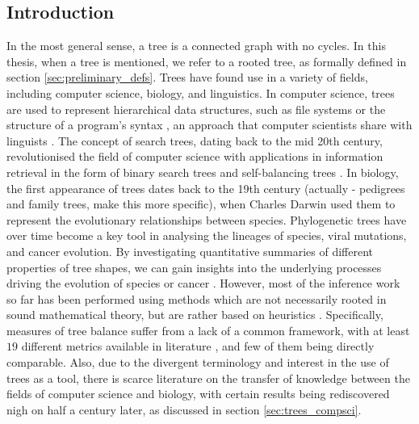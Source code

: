 \subsection{Introduction}
In the most general sense, a tree is a connected graph with no cycles. In this thesis, when a tree is
mentioned, we refer to a rooted tree, as formally defined in section \ref{sec:preliminary_defs}.
Trees have found use in a variety of fields, including computer science, biology, and linguistics.
In computer science, trees are used to represent hierarchical data structures, such as file systems \cite{nievergelt_binary_1974}
or the structure of a program's syntax \cite{knuth_semantics_1968}, an approach that computer scientists
share with linguists \cite{chomsky_syntactic_1957}. The concept of search trees, dating back to the mid 20th century,
revolutionised the field of computer science with applications in information retrieval in the form of
binary search trees and self-balancing trees \cite{nievergelt_binary_1972, knuth_art_1997}. In biology,
the first appearance of trees dates back to the 19th century (actually - pedigrees and family trees, make this more specific), when Charles Darwin used them to represent the evolutionary
relationships between species. Phylogenetic trees have over time become a key tool in analysing the
lineages of species, viral mutations, and cancer evolution. By investigating quantitative summaries of different properties
of tree shapes, we can gain insights into the underlying processes driving the evolution of species \cite{mooers_inferring_1997}
or cancer \cite{scott_inferring_2018, noble_spatial_2022}. However, most of the inference work so far has been performed
using methods which are not necessarily rooted in sound mathematical theory, but are rather based on heuristics \cite{omeara_evolutionary_2012}.
Specifically, measures of tree balance suffer from a lack of a common framework, with at least $19$ different metrics available
in literature \cite{fischer_tree_2021}, and few of them being directly comparable. Also, due to the divergent terminology and
interest in the use of trees as a tool, there is scarce literature on the transfer of knowledge between the fields of computer science
and biology, with certain results being rediscovered nigh on half a century later, as discussed in section \ref{sec:trees_compsci}.


